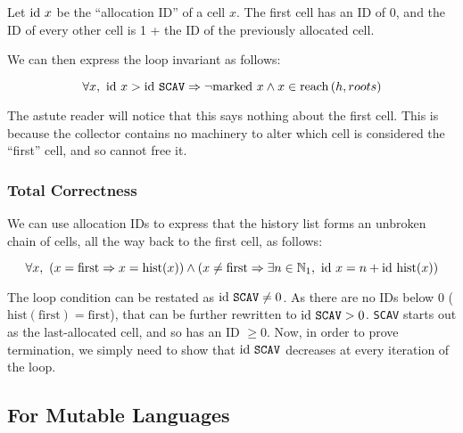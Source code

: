 Let $\mathrm{id}~x$ be the ``allocation ID'' of a cell $x$. The first cell has
an ID of 0, and the ID of every other cell is 1 + the ID of the
previously allocated cell.

We can then express the loop invariant as follows:

\[\forall x,\ \mathrm{id}~x > \mathrm{id}~\mathtt{SCAV} \Rightarrow
\lnot \mathrm{marked}~x \land x \in \mathrm{reach}\left(h, roots\right)\]

The astute reader will notice that this says nothing about the first
cell. This is because the collector contains no machinery to alter
which cell is considered the ``first'' cell, and so cannot free it.

\subsubsection{Total Correctness}

We can use allocation IDs to express that the history list forms an
unbroken chain of cells, all the way back to the first cell, as
follows:

\[\forall x,\ \left(x = \mathrm{first} \Rightarrow x =
  \mathrm{hist}(x)\right) \land \left(x \neq \mathrm{first} \Rightarrow
  \exists n \in \mathbb N_{1},\ \mathrm{id}~x = n + \mathrm{id}~\mathrm{hist}(x)\right)\]

The loop condition can be restated as $\mathrm{id}~\mathtt{SCAV} \neq 0$. As
there are no IDs below 0 ($\mathrm{hist}(\mathrm{first}) =
\mathrm{first}$), that can be further rewritten to $\mathrm{id}~\mathtt{SCAV}
> 0$. \texttt{SCAV} starts out as the last-allocated cell, and so has
an ID $\geq 0$. Now, in order to prove termination, we simply need to
show that $\mathrm{id}~\mathtt{SCAV}$ decreases at every iteration of the
loop.

\subsection{For Mutable Languages}

